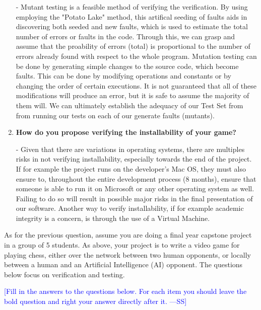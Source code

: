 \documentclass[12pt,fleqn]{examtst}
\newcommand{\authornote}[3]{\textcolor{#1}{[#3 ---#2]}}
\newcommand{\authornote}[3]{}
\newcommand{\wss}[1]{\authornote{blue}{SS}{#1}}
\begin{document}
\begin{enumerate}
  - Mutant testing is a feasible method of verifying the verification. By using employing the "Potato Lake" method, this artifical seeding of faults aids in discovering both seeded and new faults, which is used to estimate the total number of errors or faults in the code. Through this, we can grasp and assume that the proability of errors (total) is proportional to the number of errors already found with respect to the whole program. Mutation testing can be done by generating simple changes to the source code, which become faults. This can be done by modifying operations and constants or by changing the order of certain executions. It is not guaranteed that all of these modifications will produce an error, but it is safe to assume the majority of them will. We can ultimately establish the adequacy of our Test Set from from running our tests on each of our generate faults (mutants).
  
\item \textbf{How do you propose verifying the installability of your game?}

  - Given that there are variations in operating systems, there are multiples risks in not verifying installability, especially towards the end of the project. If for example the project runs on the developer's Mac OS, they must also ensure to, throughout the entire development process (8 months), ensure that someone is able to run it on Microsoft or any other operating system as well. Failing to do so will result in possible major risks in the final presentation of our software. Another way to verify installability, if for example academic integrity is a concern, is through the use of a Virtual Machine. 
  
\end{enumerate}


\newpage

 As for the previous question, assume you are doing a final
year capstone project in a group of 5 students.  As above, your project
is to write a video game for playing chess, either over the network between two
human opponents, or locally between a human and an Artificial Intelligence
(AI) opponent.  The questions below focus on verification and testing.

\bigskip

\noindent \wss{Fill in the answers to the questions below.  For each item you
  should leave the bold question and right your answer directly after it.}
\end{document}

